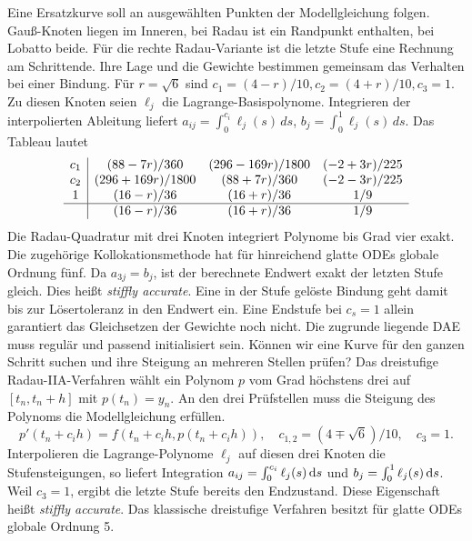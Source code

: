 \hypertarget{punkt3-3-1}{}
Eine Ersatzkurve soll an ausgewählten Punkten der Modellgleichung folgen. Gauß-Knoten liegen im Inneren, bei Radau ist ein Randpunkt enthalten, bei Lobatto beide. Für die rechte Radau-Variante ist die letzte Stufe eine Rechnung am Schrittende. Ihre Lage und die Gewichte bestimmen gemeinsam das Verhalten bei einer Bindung.
\hypertarget{punkt3-3-2}{}
Für \(r=\sqrt6\) sind \(c_1=(4-r)/10, c_2=(4+r)/10, c_3=1\). Zu diesen Knoten seien \(\ell_j\) die Lagrange-Basispolynome. Integrieren der interpolierten Ableitung liefert \(a_{ij}=\int_0^{c_i}\ell_j(s)\,ds\), \(b_j=\int_0^1\ell_j(s)\,ds\). Das Tableau lautet
\[
\begin{array}{c|ccc}
c_1&(88-7r)/360&(296-169r)/1800&(-2+3r)/225\\
c_2&(296+169r)/1800&(88+7r)/360&(-2-3r)/225\\
1&(16-r)/36&(16+r)/36&1/9\\\hline
 &(16-r)/36&(16+r)/36&1/9
\end{array}
\]
Die Radau-Quadratur mit drei Knoten integriert Polynome bis Grad vier exakt. Die zugehörige Kollokationsmethode hat für hinreichend glatte ODEs globale Ordnung fünf.
\hypertarget{punkt3-3-3}{}
Da \(a_{3j}=b_j\), ist der berechnete Endwert exakt der letzten Stufe gleich. Dies heißt \emph{stiffly accurate}. Eine in der Stufe gelöste Bindung geht damit bis zur Lösertoleranz in den Endwert ein. Eine Endstufe bei \(c_s=1\) allein garantiert das Gleichsetzen der Gewichte noch nicht. Die zugrunde liegende DAE muss regulär und passend initialisiert sein.
Können wir eine Kurve für den ganzen Schritt suchen und ihre Steigung an mehreren Stellen prüfen? Das dreistufige Radau-IIA-Verfahren wählt ein Polynom \(p\) vom Grad höchstens drei auf \([t_n,t_n+h]\) mit \(p(t_n)=y_n\). An den drei Prüfstellen muss die Steigung des Polynoms die Modellgleichung erfüllen.
\[
 p'(t_n+c_i h)=f(t_n+c_i h,p(t_n+c_i h)),\quad
 c_{1,2}=(4\mp\sqrt 6)/10,\quad c_3=1 .
\]
Interpolieren die Lagrange-Polynome \(\ell_j\) auf diesen drei Knoten die Stufensteigungen, so liefert Integration \(a_{ij}=\int_0^{c_i}\ell_j(s)\,\mathrm{d} s\) und \(b_j=\int_0^1\ell_j(s)\,\mathrm{d} s\). Weil \(c_3=1\), ergibt die letzte Stufe bereits den Endzustand. Diese Eigenschaft heißt \emph{stiffly accurate}. Das klassische dreistufige Verfahren besitzt für glatte ODEs globale Ordnung 5.
